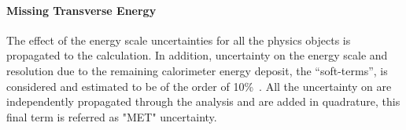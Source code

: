 \paragraph{Missing Transverse Energy}
The effect of the energy scale
uncertainties for all the physics objects is propagated to the \met calculation.
In addition, uncertainty on the energy scale and resolution due to the remaining 
calorimeter energy deposit, the ``soft-terms'', is considered and estimated to be of the order of 10\%~\cite{ETMISS}. All the
uncertainty on \met are independently propagated through the analysis and are
added in quadrature, this final term is referred as "MET" uncertainty.


	

